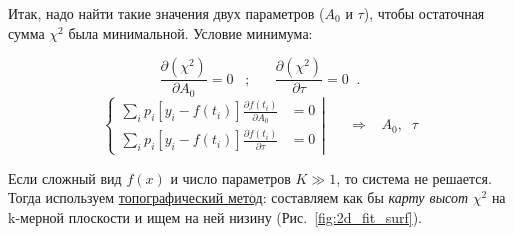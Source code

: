 
Итак, надо найти такие значения двух параметров ($A_0$ и $\tau$), чтобы остаточная сумма $\chi^2$ была ми\-ни\-мальной. Условие минимума:

 \begin{displaymath}
\frac{\partial(\chi^2)}{\partial A_0}=0\;\;\;;\;\;\;\;\;\;
\frac{\partial(\chi^2)}{\partial \tau}=0\;\;.
 \end{displaymath}
 \begin{displaymath}
 \left\{
 \begin{array}{cc}
 \sum_i p_i \left[y_i-f(t_i)\right]\frac{\partial f(t_i)}{\partial A_0} &= 0\\[2mm]
 \sum_i p_i \left[y_i-f(t_i)\right]\frac{\partial f(t_i)}{\partial \tau} &= 0
 \end{array}
 \right|\;\;\;\;\;\;\Rightarrow\;\;\;A_0,\;\;\tau
 \end{displaymath}

Если сложный вид $f(x)$ и число параметров $K\gg 1$, то система не решается. Тогда используем \underline{топографический метод}: составляем как бы {\sl карту высот} $\chi^2$ на k-мерной плоскости и ищем на ней низину (Рис.~\ref{fig:2d_fit_surf}).

